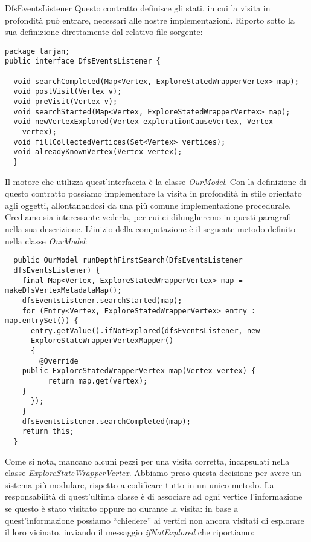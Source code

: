 \begin{paragraph}{DfsEventsListener}
  Questo contratto definisce gli stati, in cui la visita in
  profondit\`a pu\`o entrare, necessari alle nostre
  implementazioni. Riporto sotto la sua definizione direttamente dal
  relativo file sorgente:

\begin{lstlisting}
package tarjan; 
public interface DfsEventsListener {

  void searchCompleted(Map<Vertex, ExploreStatedWrapperVertex> map);
  void postVisit(Vertex v);
  void preVisit(Vertex v);
  void searchStarted(Map<Vertex, ExploreStatedWrapperVertex> map);
  void newVertexExplored(Vertex explorationCauseVertex, Vertex
    vertex);
  void fillCollectedVertices(Set<Vertex> vertices);
  void alreadyKnownVertex(Vertex vertex);
  }
\end{lstlisting}
Il motore che utilizza quest'interfaccia \`e la classe
\emph{OurModel}. Con la definizione di questo contratto possiamo
implementare la visita in profondit\`a in stile orientato agli
oggetti, allontanandosi da una pi\`u comune implementazione
procedurale. Crediamo sia interessante vederla, per cui ci
dilungheremo in questi paragrafi nella sua descrizione. L'inizio della
computazione \`e il seguente metodo definito nella classe
\emph{OurModel}:
\begin{lstlisting}
  public OurModel runDepthFirstSearch(DfsEventsListener
  dfsEventsListener) { 
    final Map<Vertex, ExploreStatedWrapperVertex> map = makeDfsVertexMetadataMap();
    dfsEventsListener.searchStarted(map);
    for (Entry<Vertex, ExploreStatedWrapperVertex> entry : map.entrySet()) {
      entry.getValue().ifNotExplored(dfsEventsListener,	new
      ExploreStateWrapperVertexMapper() 
      {
        @Override
	public ExploreStatedWrapperVertex map(Vertex vertex) {
          return map.get(vertex);
	}
      });
    }
    dfsEventsListener.searchCompleted(map);
    return this;
  }
\end{lstlisting}
Come si nota, mancano alcuni pezzi per una visita corretta,
incapsulati nella classe \emph{ExploreStateWrapperVertex}. Abbiamo
preso questa decisione per avere un sistema pi\`u modulare, rispetto a
codificare tutto in un unico metodo. La responsabilit\`a di
quest'ultima classe \`e di associare ad ogni vertice l'informazione se
questo \`e stato visitato oppure no durante la visita: in base a
quest'informazione possiamo ``chiedere'' ai vertici non ancora
visitati di esplorare il loro vicinato, inviando il messaggio
\emph{ifNotExplored} che riportiamo:

\end{paragraph}

